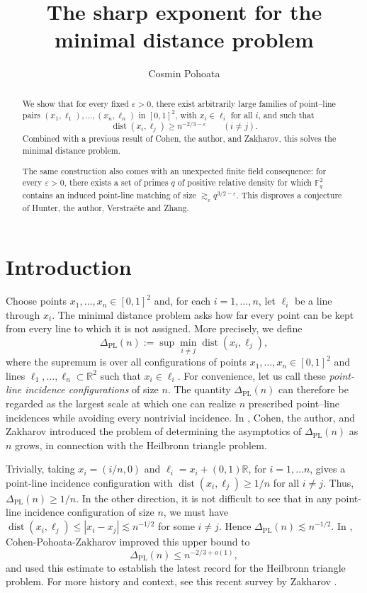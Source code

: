 \documentclass[11pt,reqno]{amsart}
\title[The sharp exponent for the minimal distance problem]
      {The sharp exponent for the minimal distance problem}
\author{Cosmin Pohoata}
\date{}
\theoremstyle{definition}
\theoremstyle{remark}
\newcommand{\R}{\mathbb{R}}
\newcommand{\eps}{\varepsilon}
\newcommand{\dist}{\operatorname{dist}}
\newcommand{\PL}{\Delta_{\mathrm{PL}}}
\begin{document}
\begin{abstract}
We show that for every fixed $\eps>0$, there exist arbitrarily large families of point--line pairs $(x_1,\ell_1),\ldots,(x_n,\ell_n)$ in $[0,1]^2$, with $x_i \in \ell_i$ for all $i$, and such that
\[
        \dist(x_i,\ell_j)\ge n^{-2/3-\eps}\qquad(i\ne j).
\]
Combined with a previous result of Cohen, the author, and Zakharov, this solves the minimal distance problem.

The same construction also comes with an unexpected finite field consequence: for every $\eps>0$, there exists a set of primes $q$ of positive relative density for which $\mathbb F_q^2$ contains an induced point-line matching of size $\gtrsim_\eps q^{3/2-\eps}$. This disproves a conjecture of Hunter, the author, Verstra\"ete and Zhang. 
\end{abstract}

\maketitle

\section{Introduction}
\label{sec:intro}

Choose points $x_1,\ldots,x_n\in[0,1]^2$ and, for each $i=1,\ldots,n$, let $\ell_i$ be a line through $x_i$. The minimal distance problem asks how far every
point can be kept from every line to which it is not assigned. More
precisely, we define
\begin{equation}
\label{eq:pl-definition}
        \PL(n):=
        \sup \min_{i\ne j}\dist(x_i,\ell_j),
\end{equation}
where the supremum is over all configurations of points $x_1,\ldots,x_n\in[0,1]^2$ and lines $\ell_1,\ldots,\ell_n \subset \mathbb{R}^{2}$ such that $x_i \in \ell_i$. For convenience, let us call these {\it{point-line incidence configurations}} of size $n$.  The quantity $\PL(n)$ can therefore be regarded as the largest scale at which one can realize $n$ prescribed point--line incidences while avoiding every nontrivial incidence. In \cite{CPZ2025}, Cohen, the author, and Zakharov introduced the problem of determining the asymptotics of $\PL(n)$ as $n$ grows, in connection with the Heilbronn triangle problem. 

Trivially, taking $x_i=(i/n,0)$ and $\ell_i=x_i+(0,1)\R$, for $i=1,\ldots n$, gives a point-line incidence configuration with $\dist(x_i,\ell_j) \ge 1/n$ for all $i \neq j$. Thus, $\PL(n) \geq 1/n$. In the other direction, it is not difficult to see that in any point-line incidence configuration of size $n$, we must have
$\dist(x_i,\ell_j)\le |x_i-x_j| \lesssim n^{-1/2}$ for some $i \neq j$. Hence $\PL(n)\lesssim n^{-1/2}$. In \cite{CPZ2025}, Cohen-Pohoata-Zakharov improved this upper bound to 
\begin{equation} \label{eq:CPZ}
\PL(n)\le n^{-2/3+o(1)},
\end{equation}
and used this estimate to establish the latest record for the Heilbronn triangle problem. For more history and context, see this recent survey by Zakharov \cite{Zakharov2026}. 
\end{document}
